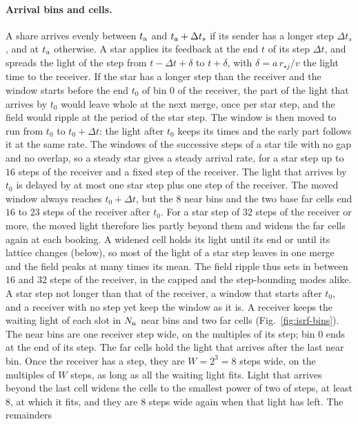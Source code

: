 \paragraph{Arrival bins and cells.} A share arrives evenly between $t_{\rm a}$
and $t_{\rm a}+\Delta t_s$ if its sender has a longer step $\Delta t_s$, and
at $t_{\rm a}$ otherwise. A star applies its feedback at the end $t$ of its step
$\Delta t$, and spreads the light of the step from $t-\Delta t+\delta$ to
$t+\delta$, with $\delta=a\,r_{\star j}/v$ the light time to the receiver.
If the star has a longer step than the receiver and the window starts before the end $t_0$ of
bin $0$ of the receiver, the part of the light that arrives by $t_0$ would leave
whole at the next merge, once per star step, and the field would ripple at the
period of the star step. The window is then moved to run from $t_0$ to
$t_0+\Delta t$: the light after $t_0$ keeps its times and the early part follows
it at the same rate. The windows of the successive steps of a star tile with no
gap and no overlap, so a steady star gives a steady arrival rate, for a star step
up to $16$ steps of the receiver and a fixed step of the receiver. The light that
arrives by $t_0$ is delayed by at most one star step plus one step of the receiver. The
moved window always reaches $t_0+\Delta t$, but the $8$ near bins and the two base far
cells end $16$ to $23$ steps of the receiver after $t_0$. For a star step of $32$ steps of
the receiver or more, the moved light therefore lies partly beyond them and widens the far
cells again at each booking. A widened cell holds its light until its end or until its
lattice changes (below), so most of the light of a star step leaves in one merge and the
field peaks at many times its mean. The field ripple thus sets in between $16$ and $32$
steps of the receiver, in the capped and the step-bounding modes alike. A star step not longer than
that of the receiver, a window that starts after $t_0$, and a receiver with no
step yet keep the window as it is. A
receiver keeps the waiting light of each slot in $N_{\rm n}$ near bins and two far
cells (Fig.~\ref{fig:isrf-bins}). The near bins are one receiver step wide, on
the multiples of its step; bin $0$ ends at the end of its step. The far cells
hold the light that arrives after the last near bin. Once the receiver has a
step, they are $W=2^3=8$ steps wide, on the multiples of $W$ steps, as long as
all the waiting light fits. Light that arrives beyond the last cell widens the
cells to the smallest power of two of steps, at least $8$, at which it fits,
and they are $8$ steps wide again when that light has left. The remainders
